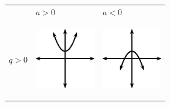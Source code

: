 \begin{center}
\label{m39345*uid116}
\noindent
{}
\tablelasttail{}
\begin{xtabular*}{\mytablewidth}[t]{|p{10\mystarwidth}|p{10\mystarwidth}|p{10\mystarwidth}|}\hline
&
    $a>0$
    &
    $a<0$
\tabularnewline{}
    $q>0$
    &
\setcounter{subfigure}{0}
\label{m39345*id241967}
\begin{center}
\label{m39345*id241967!!!underscore!!!media}\label{m39345*id241967!!!underscore!!!printimage}\includegraphics[width=100px]{col11306.imgs/m39345_MG10C11_015.png} %
\vspace{2pt}
\vspace{.1in}
\end{center}    
    &
\setcounter{subfigure}{0}
\label{m39345*id241979}
\begin{center}
\label{m39345*id241979!!!underscore!!!media}\label{m39345*id241979!!!underscore!!!printimage}\includegraphics[width=100px]{col11306.imgs/m39345_MG10C11_016.png} %

\end{center}
\end{xtabular*}
\end{center}
